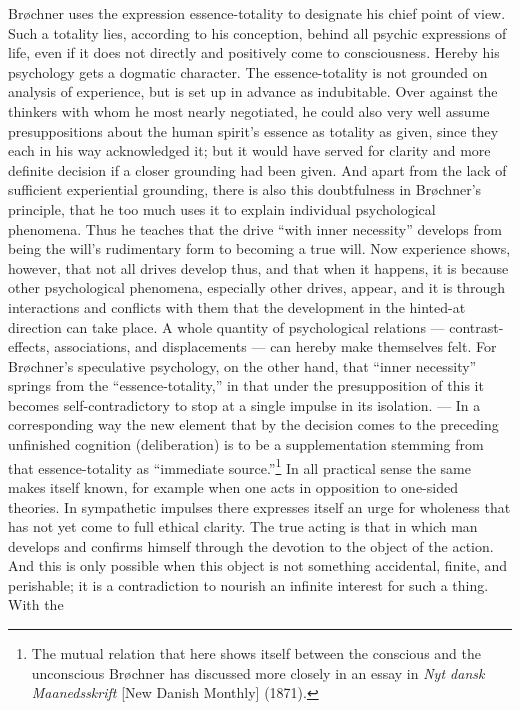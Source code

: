 \documentclass[12pt,a4paper]{book}
\newcommand{\opage}[1]{\marginnote{\footnotesize\textit{[#1]}}}
\begin{document}
Brøchner uses the expression essence-totality to designate his chief point of view. Such a
totality lies, according to his conception, behind all psychic expressions of life, even if it
does not directly and positively come to consciousness. Hereby his psychology gets a dogmatic
character. The essence-totality is not grounded on analysis of experience, but is set up in
advance as indubitable. Over against the thinkers with whom he most nearly negotiated, he could
also very well assume presuppositions about the human spirit's essence as totality as given,
since they each in his way acknowledged it; but it would have served for clarity and more
definite decision if a closer grounding had been given. And apart from the lack of sufficient
experiential grounding, there is also this doubtfulness in Brøchner's principle, that he too much
uses it to explain individual psychological phenomena. Thus he teaches that the drive ``with
inner necessity'' develops from being the will's rudimentary form to becoming a true will. Now
experience shows, however, that not all drives develop thus, and that when it happens, it is
because other psychological phenomena, especially other drives, appear, and it is through
interactions and conflicts with them that the development in the hinted-at direction can take
place. A whole quantity of psychological relations --- contrast-effects, associations, and
displacements --- can hereby make themselves felt. For Brøchner's speculative psychology, on the
other hand, that ``inner necessity'' springs from the ``essence-totality,'' in that under the
presupposition of this it becomes self-contradictory to stop at a single impulse in \opage{201}its
isolation. --- In a corresponding way the new element that by the decision comes to the preceding
unfinished cognition (deliberation) is to be a supplementation stemming from that essence-totality
as ``immediate source.''\footnote{The mutual relation that here shows itself between the conscious
and the unconscious Brøchner has discussed more closely in an essay in \emph{Nyt dansk
Maanedsskrift} [New Danish Monthly] (1871).} In all practical sense the same makes itself known,
for example when one acts in opposition to one-sided theories. In sympathetic impulses there
expresses itself an urge for wholeness that has not yet come to full ethical clarity. The true
acting is that in which man develops and confirms himself through the devotion to the object of
the action. And this is only possible when this object is not something accidental, finite, and
perishable; it is a contradiction to nourish an infinite interest for such a thing. With the
\end{document}
